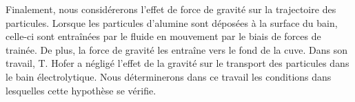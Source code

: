 Finalement, nous considérerons l'effet de force de gravité sur la
trajectoire des particules. Lorsque les particules d'alumine sont
déposées à la surface du bain, celle-ci sont entraînées par le fluide
en mouvement par le biais de forces de trainée. De plus, la force de
gravité les entraîne vers le fond de la cuve. Dans son travail,
T. Hofer \cite{Hofer2011} a négligé l'effet de la gravité sur le
transport des particules dans le bain électrolytique. Nous
déterminerons dans ce travail les conditions dans lesquelles cette
hypothèse se vérifie.





